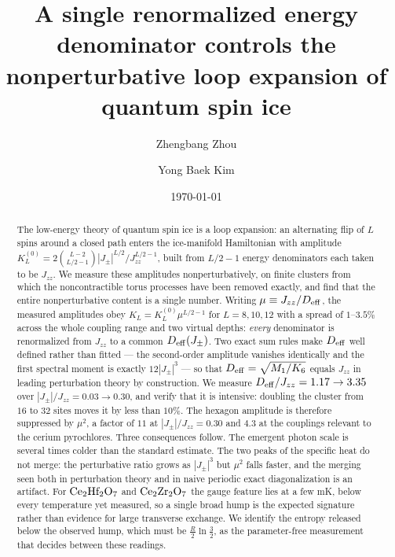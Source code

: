 \documentclass[aps,prb,preprint,amsmath,amssymb,superscriptaddress,
longbibliography,floatfix]{revtex4-2}
\newcommand{\Jzz}{J_{zz}}
\newcommand{\Jpm}{J_{\pm}}
\newcommand{\Deff}{D_{\rm eff}}
\begin{document}
\title{A single renormalized energy denominator controls the\\
nonperturbative loop expansion of quantum spin ice}

\author{Zhengbang Zhou}

\author{Yong Baek Kim}

\date{\today}

\begin{abstract}
The low-energy theory of quantum spin ice is a loop expansion: an alternating
flip of $L$ spins around a closed path enters the ice-manifold Hamiltonian with
amplitude $K_L^{(0)}=2\binom{L-2}{L/2-1}|\Jpm|^{L/2}/\Jzz^{L/2-1}$, built from
$L/2-1$ energy denominators each taken to be $\Jzz$.  We measure these
amplitudes nonperturbatively, on finite clusters from which the noncontractible
torus processes have been removed exactly, and find that the entire
nonperturbative content is a single number.  Writing $\mu\equiv\Jzz/\Deff$, the
measured amplitudes obey $K_L=K_L^{(0)}\mu^{L/2-1}$ for $L=8,10,12$ with a
spread of $1$--$3.5\%$ across the whole coupling range and two virtual depths:
\emph{every} denominator is renormalized from $\Jzz$ to a common
$\Deff(\Jpm)$.  Two exact sum rules make $\Deff$ well defined rather than
fitted --- the second-order amplitude vanishes identically and the first
spectral moment is exactly $12|\Jpm|^3$ --- so that $\Deff=\sqrt{M_1/K_6}$
equals $\Jzz$ in leading perturbation theory by construction.  We measure
$\Deff/\Jzz=1.17\rightarrow3.35$ over $|\Jpm|/\Jzz=0.03\rightarrow0.30$, and
verify that it is intensive: doubling the cluster from $16$ to $32$ sites moves
it by less than $10\%$.  The hexagon amplitude is therefore suppressed by
$\mu^2$, a factor of $11$ at $|\Jpm|/\Jzz=0.30$ and $4.3$ at the couplings
relevant to the cerium pyrochlores.  Three consequences follow.  The emergent
photon scale is several times colder than the standard estimate.  The two
peaks of the specific heat do not merge: the perturbative ratio grows as
$|\Jpm|^3$ but $\mu^2$ falls faster, and the merging seen both in perturbation
theory and in naive periodic exact diagonalization is an artifact.  For
$\rm Ce_2Hf_2O_7$ and $\rm Ce_2Zr_2O_7$ the gauge feature lies at a few mK,
below every temperature yet measured, so a single broad hump is the expected
signature rather than evidence for large transverse exchange.  We identify the
entropy released below the observed hump, which must be
$\tfrac{R}{2}\ln\tfrac32$, as the parameter-free measurement that decides
between these readings.
\end{abstract}
\end{document}
